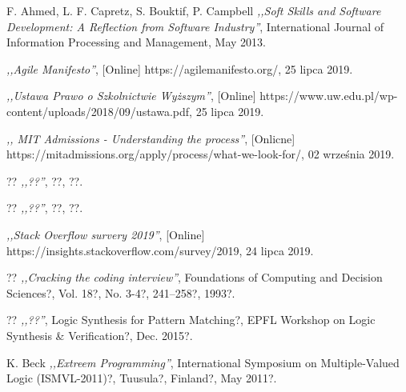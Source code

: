 
\begin{thebibliography}{99}


 F. Ahmed, L. F. Capretz, S. Bouktif, P. Campbell \emph{,,Soft Skills and Software Development: A Reflection from Software Industry''}, International Journal of Information Processing and Management, May 2013.

 \emph{,,Agile Manifesto''}, [Online] https://agilemanifesto.org/, 25 lipca 2019.

 \emph{,,Ustawa Prawo o Szkolnictwie Wyższym''}, [Online] https://www.uw.edu.pl/wp-content/uploads/2018/09/ustawa.pdf, 25 lipca 2019.

 \emph{,, MIT Admissions - Understanding the process''}, [Onlicne] https://mitadmissions.org/apply/process/what-we-look-for/, 02 września 2019.

 ??  \emph{,,??''}, ??, ??.

 ??  \emph{,,??''}, ??, ??.

 \emph{,,Stack Overflow survery 2019''}, [Online] https://insights.stackoverflow.com/survey/2019, 24 lipca 2019.

 ?? \emph{,,Cracking the coding interview''}, Foundations of Computing and Decision Sciences?, Vol. 18?, No. 3-4?, 241–258?, 1993?.

 ?? \emph{,,??''}, Logic Synthesis for Pattern Matching?, EPFL Workshop on Logic Synthesis \& Verification?, Dec. 2015?.

 K. Beck \emph{,,Extreem Programming''}, International Symposium on Multiple-Valued Logic (ISMVL-2011)?, Tuusula?, Finland?, May 2011?.


\end{thebibliography}
